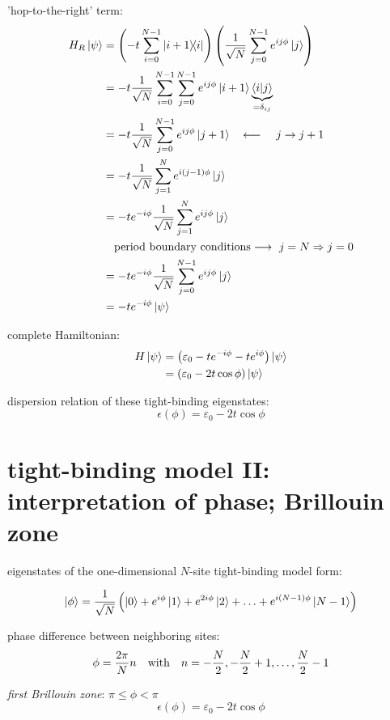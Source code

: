 \documentclass[10pt, a4paper, twocolumn]{article}
\newcommand{\deff}[1]{\par \noindent \textit{#1}: }
\newcommand{\arr}{\ensuremath{\longrightarrow\ }}
\newcommand{\larr}{\ensuremath{\longleftarrow\ }}
\newcommand{\eps}{\ensuremath{\varepsilon _0}}
\begin{document}
'hop-to-the-right' term:
\begin{equation*}
\begin{aligned}
H_R\ket\psi &=
\left( -t \sum _{i=0}^{N-1} \dyad{i+1}{i} \right)
\left(\frac{1}{\sqrt N}
\sum _{j=0}^{N-1} e^{ij\phi} \ket j \right)
\\ &= -t \frac{1}{\sqrt N}
\sum _{i=0}^{N-1} \sum _{j=0}^{N-1}e^{ij\phi} \ket{i+1}
\underbrace{\ip{i}{j}}_{=\delta _{ij}}
\\ &= -t \frac{1}{\sqrt N} \sum _{j=0}^{N-1}
e^{ij\phi} \ket{j+1} \qq{\larr} j \rightarrow j+1
\\ &= -t \frac{1}{\sqrt N} \sum _{j=1}^N
e^{i(j-1)\phi} \ket j
\\ &= -t e^{-i\phi} \frac{1}{\sqrt N}
\sum_{j=1}^N e^{ij\phi} \ket j
\\ & \quad \text{period boundary conditions}
\arr j=N \Rightarrow j=0
\\ &= -te^{-i\phi}\frac{1}{\sqrt N}
\sum _{j=0}^{N-1}e^{ij\phi}\ket j
\\&= -t e^{-i \phi} \ket \psi
\end{aligned}
\end{equation*}

complete Hamiltonian:
\begin{equation*}
\begin{aligned}
H\ket \psi &=
\left( \eps - te^{-i\phi}-te^{i\phi}\right)\ket\psi
\\&= (\eps - 2t \cos \phi ) \ket \psi
\end{aligned}
\end{equation*}

dispersion relation of these tight-binding eigenstates:
\[\epsilon (\phi) = \eps - 2t \cos \phi \]

\section{tight-binding model II: interpretation of phase; Brillouin zone}
eigenstates of the one-dimensional $N$-site tight-binding model form:

\[\ket\phi = \frac{1}{\sqrt N}
\left( \ket 0 + e^{i\phi}\ket 1 + e^{2i\phi}\ket2
+\ldots + e^{i(N-1)\phi} \ket{N-1} \right) \]

phase difference between neighboring sites:
\[ \phi = \frac{2\pi}{N}n \qq{with}
n=-\frac{N}{2}, -\frac{N}{2} +1, \ldots,\frac{N}{2}-1 \]

\deff{first Brillouin zone} $\pi\leq\phi < \pi$
\[\epsilon (\phi) = \eps -2t\cos\phi\]
\end{document}
